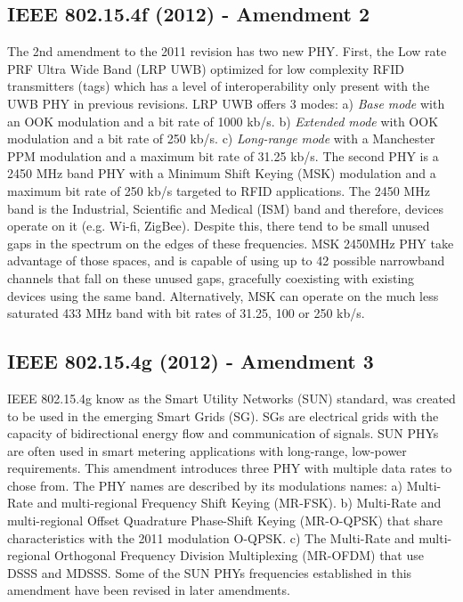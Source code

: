 \documentclass[conference]{IEEEtran}
\begin{document}
\subsection{IEEE 802.15.4f (2012) - Amendment 2 }\label{wpan2012f}
 The 2nd amendment \cite{std2012f} to the 2011 revision has two new PHY. First, the Low rate PRF Ultra Wide Band (LRP UWB) optimized for low complexity RFID transmitters (tags) which has a level of interoperability  only present with the UWB PHY in previous revisions. LRP UWB offers 3 modes: a) \textit{Base mode} with an OOK modulation and a bit rate of 1000 kb/s. b) \textit{Extended mode}  with OOK modulation and a bit rate of 250 kb/s. c) \textit{Long-range mode} with a Manchester PPM modulation and a maximum bit rate of 31.25 kb/s. The second PHY is a 2450 MHz band PHY with a Minimum Shift Keying (MSK) modulation and a maximum bit rate of 250 kb/s targeted to RFID applications. The 2450 MHz band is the Industrial, Scientific and Medical (ISM) band and therefore, devices operate on it (e.g. Wi-fi, ZigBee). Despite this, there tend to be small unused gaps in the spectrum on the edges of these frequencies. MSK 2450MHz PHY take advantage of those spaces, and is capable of using up to 42 possible narrowband channels that fall on these unused gaps, gracefully coexisting with existing devices using the same band. Alternatively, MSK can operate on the much less saturated 433 MHz band with bit rates of 31.25, 100 or 250 kb/s.
\subsection{IEEE 802.15.4g (2012) - Amendment 3 }\label{wpan2012g}
IEEE 802.15.4g \cite{std2012g} know as the Smart Utility Networks (SUN) standard, was created to be used in the emerging Smart Grids (SG). SGs are electrical grids with the capacity of bidirectional energy flow and communication of signals\cite{smartGrid}. SUN PHYs are often used in smart metering applications with long-range, low-power requirements. This amendment introduces three PHY with multiple data rates to chose from. The PHY names are described by its modulations names: a) Multi-Rate and multi-regional Frequency Shift Keying (MR-FSK). b) Multi-Rate and multi-regional Offset Quadrature Phase-Shift Keying (MR-O-QPSK) that share characteristics with the 2011 modulation O-QPSK. c) The Multi-Rate and multi-regional Orthogonal Frequency Division Multiplexing (MR-OFDM) that use DSSS and MDSSS. Some of the SUN PHYs frequencies established in this amendment have been revised in later amendments.
\end{document}
